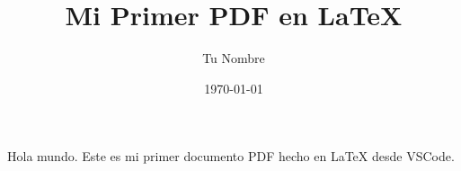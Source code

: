 \documentclass{article}
\title{Mi Primer PDF en LaTeX}
\author{Tu Nombre}
\date{\today}
\begin{document}
\maketitle

Hola mundo. Este es mi primer documento PDF hecho en \LaTeX{} desde VSCode.
\end{document}
